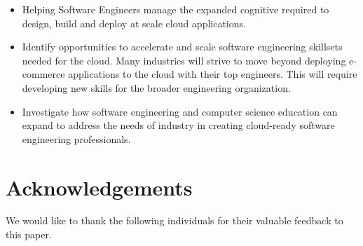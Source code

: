 \documentclass[conference]{IEEEconf}
\begin{document}
\begin{itemize}
	\item Helping Software Engineers manage the expanded cognitive required to design, build and deploy at scale cloud applications.
	\item Identify opportunities to accelerate and scale software engineering skillsets needed for the cloud. Many industries will strive to move beyond deploying e-commerce applications to the cloud with their top engineers. This will require developing new skills for the broader engineering organization.
	\item Investigate how software engineering and computer science education can expand to address the needs of industry in creating cloud-ready software engineering professionals. 
\end{itemize}

\section{Acknowledgements}
We would like to thank the following individuals for their valuable feedback to this paper. 


\end{document}

